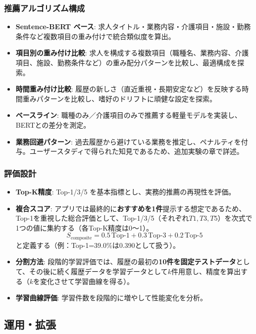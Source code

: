 \subsubsection*{推薦アルゴリズム構成}
	\begin{itemize}
		\item \textbf{Sentence-BERT ベース}: 求人タイトル・業務内容・介護項目・施設・勤務条件など複数項目の重み付けで統合類似度を算出。
		\item \textbf{項目別の重み付け比較}: 求人を構成する複数項目（職種名、業務内容、介護項目、施設、勤務条件など）の重み配分パターンを比較し、最適構成を探索。
		\item \textbf{時間重み付け比較}: 履歴の新しさ（直近重視・長期安定など）を反映する時間重みパターンを比較し、嗜好のドリフトに頑健な設定を探索。
		\item \textbf{ベースライン}: 職種のみ／介護項目のみで推薦する軽量モデルを実装し、BERTとの差分を測定。
		\item \textbf{業務回避パターン}: 過去履歴から避けている業務を推定し、ペナルティを付与。ユーザースタディで得られた知見であるため、追加実験の章で詳述。
	\end{itemize}

\subsubsection*{評価設計}
	\begin{itemize}
		\item \textbf{Top-K精度}: Top-1/3/5 を基本指標とし、実務的推薦の再現性を評価。
		\item \textbf{複合スコア}: アプリでは最終的に\textbf{おすすめを1件}提示する想定であるため、Top-1を重視した総合評価として、Top-1/3/5（それぞれ$T1, T3, T5$）を次式で1つの値に集約する（各Top-K精度は0〜1）。
	\[
	S_{\text{composite}} = 0.5\,\text{Top-1} + 0.3\,\text{Top-3} + 0.2\,\text{Top-5}
	\]
		と定義する（例：Top-1=39.0\%は0.390として扱う）。
		\item \textbf{分割方法}: 段階的学習評価では、履歴の最初の\textbf{10件を固定テストデータ}として、その後に続く履歴データを学習データとして$k$件用意し、精度を算出する（$k$を変化させて学習曲線を得る）。
		\item \textbf{学習曲線評価}: 学習件数を段階的に増やして性能変化を分析。
	\end{itemize}


\subsection{運用・拡張}
